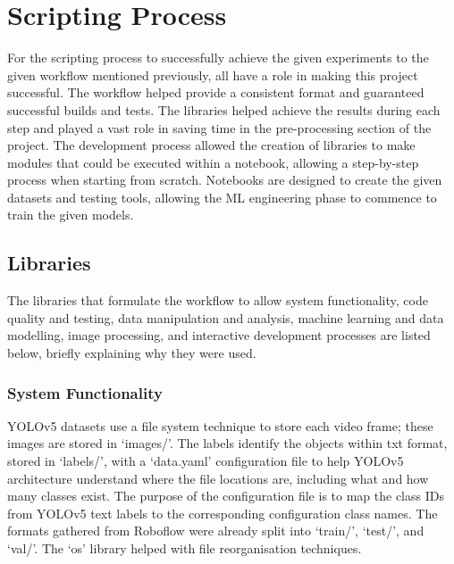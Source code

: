 \documentclass[12pt]{report} %
\begin{document}
\chapter{Scripting Process}
\label{chap:scriptingProcess}
	For the scripting process to successfully achieve the given experiments to the given workflow mentioned previously, all have a role in making this project successful. The workflow helped provide a consistent format and guaranteed successful builds and tests. The libraries helped achieve the results during each step and played a vast role in saving time in the pre-processing section of the project. The development process allowed the creation of libraries to make modules that could be executed within a notebook, allowing a step-by-step process when starting from scratch. Notebooks are designed to create the given datasets and testing tools, allowing the ML engineering phase to commence to train the given models.

	\section{Libraries}
		The libraries that formulate the workflow to allow system functionality, code quality and testing, data manipulation and analysis, machine learning and data modelling, image processing, and interactive development processes are listed below, briefly explaining why they were used.

		\subsection*{System Functionality}
			YOLOv5 datasets use a file system technique to store each video frame; these images are stored in `images/'. The labels identify the objects within txt format, stored in `labels/', with a `data.yaml' configuration file to help YOLOv5 architecture understand where the file locations are, including what and how many classes exist. The purpose of the configuration file is to map the class IDs from YOLOv5 text labels to the corresponding configuration class names. The formats gathered from Roboflow were already split into `train/', `test/', and `val/'. The `os' library helped with file reorganisation techniques.
\end{document}
